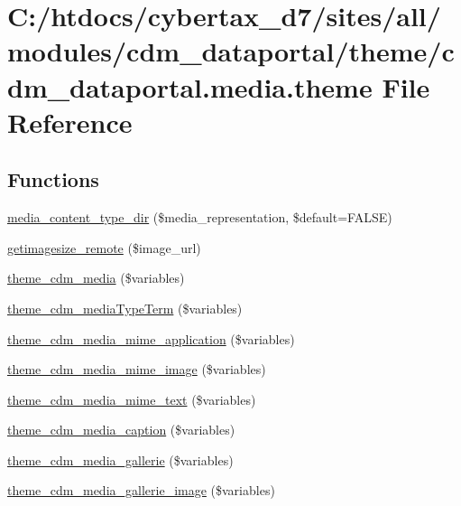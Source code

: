 \hypertarget{cdm__dataportal_8media_8theme}{\section{C\-:/htdocs/cybertax\-\_\-d7/sites/all/modules/cdm\-\_\-dataportal/theme/cdm\-\_\-dataportal.media.\-theme File Reference}
\label{cdm__dataportal_8media_8theme}
}
\subsection*{Functions}
\begin{DoxyCompactItemize}
\item 
\hyperlink{cdm__dataportal_8media_8theme_ae9c9016d762f070a686de6b5fcc2aad6}{media\-\_\-content\-\_\-type\-\_\-dir} (\$media\-\_\-representation, \$default=F\-A\-L\-S\-E)
\item 
\hyperlink{cdm__dataportal_8media_8theme_a655b1b5b4cbce57cbb3e30db38432d09}{getimagesize\-\_\-remote} (\$image\-\_\-url)
\item 
\hyperlink{cdm__dataportal_8media_8theme_a4fd56ddf8e880eb36b5ac785ddee70dc}{theme\-\_\-cdm\-\_\-media} (\$variables)
\item 
\hyperlink{cdm__dataportal_8media_8theme_a6333561d816d459e78f10069b196d20f}{theme\-\_\-cdm\-\_\-media\-Type\-Term} (\$variables)
\item 
\hyperlink{cdm__dataportal_8media_8theme_a63fa1a16bbae8b5d52ca3f1bcb909afc}{theme\-\_\-cdm\-\_\-media\-\_\-mime\-\_\-application} (\$variables)
\item 
\hyperlink{cdm__dataportal_8media_8theme_ae37ae9a4efe6cd945514c3f868a965f9}{theme\-\_\-cdm\-\_\-media\-\_\-mime\-\_\-image} (\$variables)
\item 
\hyperlink{cdm__dataportal_8media_8theme_a7e187d43cd300a0478c9a4d39b59edea}{theme\-\_\-cdm\-\_\-media\-\_\-mime\-\_\-text} (\$variables)
\item 
\hyperlink{cdm__dataportal_8media_8theme_a67ca0cfc2055ad74a57c2b9e203f18a6}{theme\-\_\-cdm\-\_\-media\-\_\-caption} (\$variables)
\item 
\hyperlink{cdm__dataportal_8media_8theme_acd96882efeb3b6ff19ba4d4ef972ad64}{theme\-\_\-cdm\-\_\-media\-\_\-gallerie} (\$variables)
\item 
\hyperlink{cdm__dataportal_8media_8theme_a522eb8d264f6dca8a81f0b768f29e94c}{theme\-\_\-cdm\-\_\-media\-\_\-gallerie\-\_\-image} (\$variables)

\end{DoxyCompactItemize}

